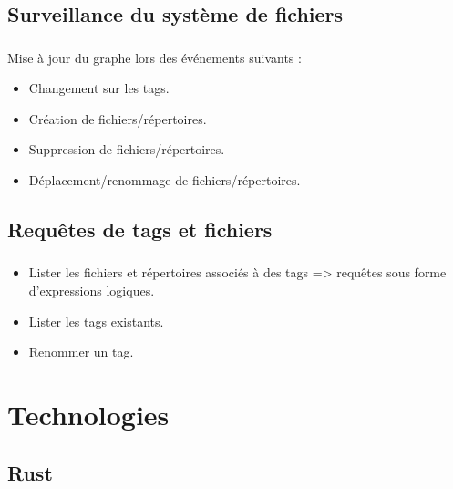 \documentclass[10pt]{beamer}
\begin{document}
\subsection{Surveillance du système de fichiers}
\begin{frame}
    \frametitle{\subsecname}
    Mise à jour du graphe lors des événements suivants :
    \bigbreak
    \pause
    \begin{itemize}
        \item Changement sur les tags.
        \pause
        \item Création de fichiers/répertoires.
        \pause
        \item Suppression de fichiers/répertoires.
        \pause
        \item Déplacement/renommage de fichiers/répertoires.
    \end{itemize}
\end{frame}

\subsection{Requêtes de tags et fichiers}
\begin{frame}
    \frametitle{\subsecname}
    \begin{itemize}
        \pause
        \item Lister les fichiers et répertoires associés à des tags => requêtes sous forme 
            d'expressions logiques.
        \pause
        \item Lister les tags existants.
        \pause
        \item Renommer un tag.
    \end{itemize}
\end{frame}

\section{Technologies}
\subsection{Rust}
\end{document}
